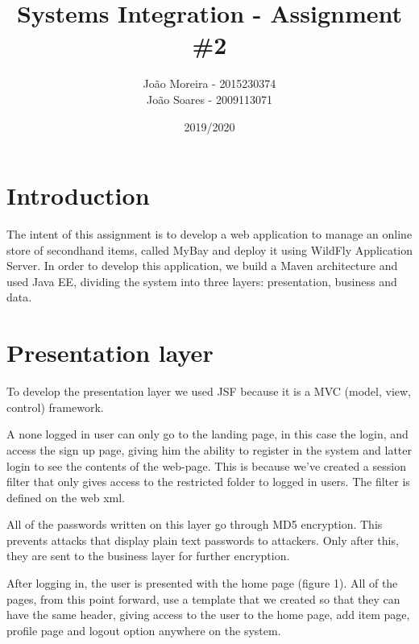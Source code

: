 \documentclass{article}
\title{Systems Integration - Assignment \#2}
\date{2019/2020}
\author{João Moreira - 2015230374 \\ 
João Soares - 2009113071 }
\begin{document}
\maketitle

\section{Introduction}

\qquad The intent of this assignment is to develop a web application to manage an online store of secondhand items, called MyBay and deploy it using WildFly Application Server. In order to develop this application, we build a Maven architecture and used \ac{Java EE}, dividing the system into three layers: presentation, business and data.

\section{Presentation layer}

\qquad To develop the presentation layer we used \ac{JSF} because it is a MVC (model, view, control) framework.

\qquad A none logged in user can only go to the landing page, in this case the login, and access the sign up page, giving him the ability to register in the system and latter login to see the contents of the web-page. This is because we've created a session filter that only gives access to the restricted folder to logged in users. The filter is defined on the web xml.

\qquad All of the passwords written on this layer go through MD5 encryption. This prevents attacks that display plain text passwords to attackers. Only after this, they are sent to the business layer for further encryption.

\qquad After logging in, the user is presented with the home page (figure 1). All of the pages, from this point forward, use a template that we created so that they can have the same header, giving access to the user to the home page, add item page, profile page and logout option anywhere on the system. 
\end{document}
